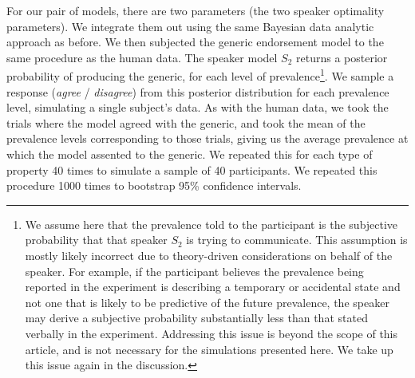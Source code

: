 \documentclass[12pt,letterpaper]{article}
\begin{document}
For our pair of models, there are two parameters (the two speaker optimality parameters).
We integrate them out using the same Bayesian data analytic approach as before.
We then subjected the generic endorsement model to the same procedure as the human data. %
The speaker model $S_2$ returns a posterior probability of producing the generic, for each level of prevalence\footnote{We assume here that the prevalence told to the participant is the subjective probability that that speaker $S_2$ is trying to communicate. This assumption is mostly likely incorrect due to theory-driven considerations on behalf of the speaker. For example, if the participant believes the prevalence being reported in the experiment is describing a temporary or accidental state and not one that is likely to be predictive of the future prevalence, the speaker may derive a subjective probability substantially less than that stated verbally in the experiment. Addressing this issue is beyond the scope of this article, and is not necessary for the simulations presented here. We take up this issue again in the discussion.}. 
We sample a response (\emph{agree} / \emph{disagree}) from this posterior distribution for each prevalence level, simulating a single subject's data.
As with the human data, we took the trials where the model agreed with the generic, and took the mean of the prevalence levels corresponding to those trials, giving us the average prevalence at which the model assented to the generic.
We repeated this for each type of property 40 times to simulate a sample of 40 participants. 
We repeated this procedure 1000 times to bootstrap 95\% confidence intervals.
\end{document}
